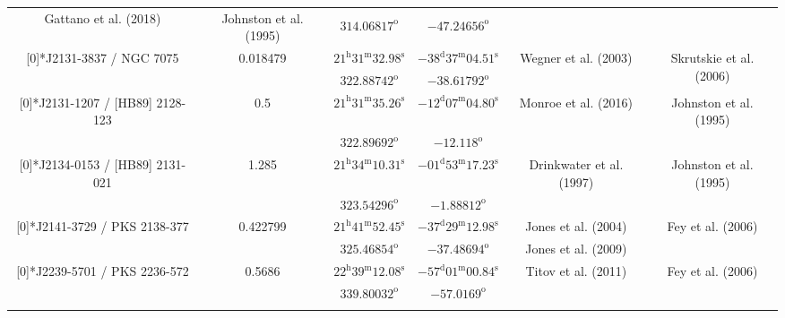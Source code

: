 \begin{landscape}
\begin{longtable}{cccccc}
    \multirow{2}[0]{*}{Gattano et al. (2018)\cite{RedRef5_2018}}& \multirow{2}[0]{*}{Johnston et al. (1995)\cite{CoordRef0_1995}} \\*
    & & $314.06817^\text{o}$ & $-47.24656^\text{o}$ & & \\ \addlinespace 
 \multirow{2}[0]{*}{J2131-3837 / NGC 7075} & \multirow{2}[0]{*}{0.018479} &  
    $21^\text{h}31^\text{m}32.98^\text{s}$  & $-38^\text{d}37^\text{m}04.51^\text{s}$  & 
    \multirow{2}[0]{*}{Wegner et al. (2003)\cite{RedRef72_2003}}& \multirow{2}[0]{*}{Skrutskie et al. (2006)\cite{CoordRef77_2006}} \\*
    & & $322.88742^\text{o}$ & $-38.61792^\text{o}$ & & \\ \addlinespace 
 \multirow{2}[0]{*}{J2131-1207 / [HB89] 2128-123} & \multirow{2}[0]{*}{0.5} &  
    $21^\text{h}31^\text{m}35.26^\text{s}$  & $-12^\text{d}07^\text{m}04.80^\text{s}$  & 
    \multirow{2}[0]{*}{Monroe et al. (2016)\cite{RedRef78_2016}}& \multirow{2}[0]{*}{Johnston et al. (1995)\cite{CoordRef0_1995}} \\*
    & & $322.89692^\text{o}$ & $-12.118^\text{o}$ & & \\ \addlinespace 
 \multirow{2}[0]{*}{J2134-0153 / [HB89] 2131-021 } & \multirow{2}[0]{*}{1.285} &  
    $21^\text{h}34^\text{m}10.31^\text{s}$  & $-01^\text{d}53^\text{m}17.23^\text{s}$  & 
    \multirow{2}[0]{*}{Drinkwater et al. (1997)\cite{RedRef79_1997}}& \multirow{2}[0]{*}{Johnston et al. (1995)\cite{CoordRef0_1995}} \\*
    & & $323.54296^\text{o}$ & $-1.88812^\text{o}$ & & \\ \addlinespace 
  \multirow{2}[0]{*}{J2141-3729 / PKS 2138-377} & \multirow{2}[0]{*}{0.422799} &  
    $21^\text{h}41^\text{m}52.45^\text{s}$  & $-37^\text{d}29^\text{m}12.98^\text{s}$  & 
    Jones et al. (2004)\cite{RedRef0_2004} & \multirow{2}[0]{*}{Fey et al. (2006)\cite{CoordRef6_2006}} \\*
    & & $325.46854^\text{o}$ & $-37.48694^\text{o}$ & Jones et al. (2009)\cite{RedRef0_2009}  & \\ \addlinespace 

 \multirow{2}[0]{*}{J2239-5701 / PKS 2236-572} & \multirow{2}[0]{*}{0.5686} &  
    $22^\text{h}39^\text{m}12.08^\text{s}$  & $-57^\text{d}01^\text{m}00.84^\text{s}$  & 
     \multirow{2}[0]{*}{Titov et al. (2011) \cite{RedRef6_2011}}& \multirow{2}[0]{*}{Fey et al. (2006)\cite{CoordRef6_2006}} \\*
      & & $339.80032^\text{o}$ & $-57.0169^\text{o}$ & & \\ \addlinespace 


\end{longtable}
\end{landscape}
